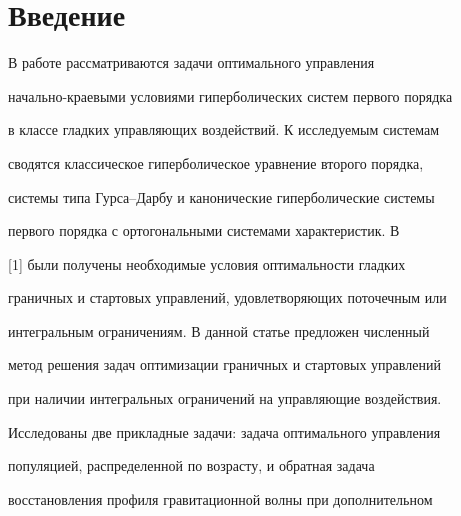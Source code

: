 \date{}




\pagestyle{plain} %







\maketitle


\label{begin}











\section*{Введение}





В работе рассматриваются задачи оптимального управления


начально-краевыми условиями гиперболических систем первого порядка


в классе гладких управляющих воздействий. К исследуемым системам


сводятся классическое гиперболическое уравнение второго порядка,


системы типа Гурса--Дарбу и канонические гиперболические системы


первого порядка с ортогональными системами характеристик. В 


[1] были получены необходимые условия оптимальности гладких


граничных и стартовых управлений, удовлетворяющих поточечным или


интегральным ограничениям. В данной статье предложен численный


метод решения задач оптимизации граничных и стартовых управлений


при наличии интегральных ограничений на управляющие воздействия.


Исследованы две прикладные задачи: задача оптимального управления


популяцией, распределенной по возрасту, и обратная задача


восстановления профиля гравитационной волны при дополнительном


